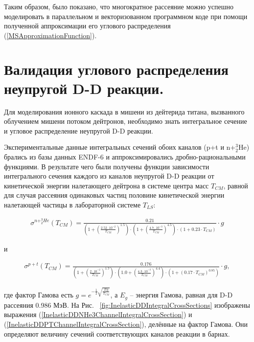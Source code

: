 \documentclass[a4paper,12pt]{article}
\begin{document}
\begin{large}
	Таким образом, было показано, что многократное рассеяние можно успешно моделировать в параллельном и векторизованном программном коде при помощи полученной аппроксимации его углового распределения (\ref{MSApproximationFunction}).
	
	
\clearpage{}
\section{Валидация углового распределения неупругой D-D реакции.}
\label{ValInelasticDD}

	Для моделирования ионного каскада в мишени из дейтерида титана, вызванного облучением мишени потоком дейтронов, необходимо знать интегральное сечение и угловое распределение неупругой D-D реакции. 
	
	Экспериментальные данные интегральных сечений обоих каналов (p+t и n+$^3_2$He) брались из базы данных ENDF-6 и аппроксимировались дробно-рациональными функциями. В результате чего были получены функции зависимости интегрального сечения каждого из каналов неупругой D-D реакции от кинетической энергии налетающего дейтрона в системе центра масс $T_{CM}$, равной для случая рассеяния одинаковых частиц половине кинетической энергии налетающей частицы в лабораторной системе $T_{LS}$:
	
\begin{equation}
\label{InelasticDDNHe3ChannelIntegralCrossSection}
\begin{aligned} 
  \sigma^{n+^3_2He}(T_{CM}) = \frac{0.21}{\left( 1 + \left(\frac{2.52\cdot 10^{-2}}{T_{CM}} \right)^{1.5} \right) \cdot \left( 1 + \left( \frac{4.7\cdot 10^{-3}}{T_{CM}} \right)^{4.5} \right) \cdot \left( 1+0.23 \cdot T_{CM} \right) } \cdot g
\end{aligned}
\end{equation}

и

\begin{equation}
\label{InelasticDDPTChannelIntegralCrossSection}
\begin{aligned} 
  \sigma^{p+t}(T_{CM}) = \frac{0.176}{\left( 1 + \left(\frac{2\cdot 10^{-2}}{T_{CM}} \right)^{1.7} \right) \cdot \left( 1.0 + \left( \frac{4.3\cdot 10^{-3}}{T_{CM}} \right)^{4.4} \right) \cdot \left( 1+\left( 0.17 \cdot T_{CM} \right)^{0.85} \right) } \cdot g,
\end{aligned}
\end{equation}
	
где фактор Гамова есть $g=e^{-\frac{1}{2}\sqrt{\frac{Eg}{T_{CM}}}}$, а $E_g$ -- энергия Гамова, равная для D-D рассеяния 0.986 МэВ. На Рис. ~\ref{fig:InelasticDDIntegralCrossSections} изображены выражения (\ref{InelasticDDNHe3ChannelIntegralCrossSection}) и (\ref{InelasticDDPTChannelIntegralCrossSection}), делённые на фактор Гамова. Они определяют величину сечений соответствующих каналов реакции в барнах.
	

\end{large}
\end{document}
